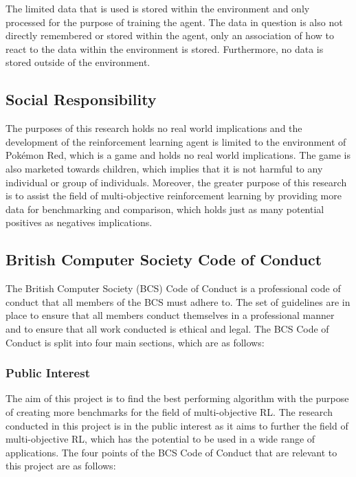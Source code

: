 The limited data that is used is stored within the environment and only processed for the purpose of training the agent. The data in question is also not directly remembered or stored within the agent, only an association of how to react to the data within the environment is stored. Furthermore, no data is stored outside of the environment. 

\subsection{Social Responsibility}

The purposes of this research holds no real world implications and the development of the reinforcement learning agent is limited to the environment of Pokémon Red, which is a game and holds no real world implications. The game is also marketed towards children, which implies that it is not harmful to any individual or group of individuals. Moreover, the greater purpose of this research is to assist the field of multi-objective reinforcement learning by providing more data for benchmarking and comparison, which holds just as many potential positives as negatives implications.

\subsection{British Computer Society Code of Conduct}

The British Computer Society (BCS) Code of Conduct is a professional code of conduct that all members of the BCS must adhere to. The set of guidelines are in place to ensure that all members conduct themselves in a professional manner and to ensure that all work conducted is ethical and legal. \cite{BSC2022codeofconduct} The BCS Code of Conduct is split into four main sections, which are as follows:

\subsubsection{Public Interest}

The aim of this project is to find the best performing algorithm with the purpose of creating more benchmarks for the field of multi-objective RL. The research conducted in this project is in the public interest as it aims to further the field of multi-objective RL, which has the potential to be used in a wide range of applications. The four points of the BCS Code of Conduct that are relevant to this project are as follows:


